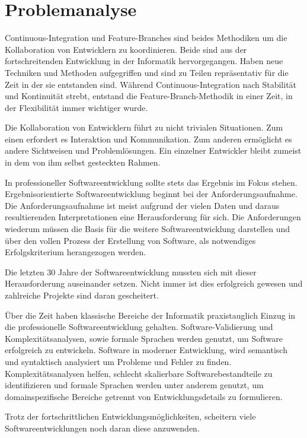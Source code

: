 \chapter{Problemanalyse}

Continuous-Integration und Feature-Branches sind beides Methodiken um die Kollaboration von Entwicklern zu koordinieren. Beide sind aus der fortschreitenden Entwicklung in der Informatik hervorgegangen. Haben neue Techniken und Methoden aufgegriffen und sind zu Teilen repräsentativ für die Zeit in der sie entstanden sind. Während Continuous-Integration nach Stabilität und Kontinuität strebt, entstand die Feature-Branch-Methodik in einer Zeit, in der Flexibilität immer wichtiger wurde.

Die Kollaboration von Entwicklern führt zu nicht trivialen Situationen. Zum einen erfordert es Interaktion und Kommunikation. Zum anderen ermöglicht es andere Sichtweisen und Problemlösungen. Ein einzelner Entwickler bleibt zumeist in dem von ihm selbst gesteckten Rahmen.

In professioneller Softwareentwicklung sollte stets das Ergebnis im Fokus stehen. Ergebnisorientierte Softwareentwicklung beginnt bei der Anforderungsaufnahme. Die Anforderungsaufnahme ist meist aufgrund der vielen Daten und daraus resultierenden Interpretationen eine Herausforderung für sich. Die Anforderungen wiederum müssen die Basis für die weitere Softwareentwicklung darstellen und über den vollen Prozess der Erstellung von Software, als notwendiges Erfolgskriterium herangezogen werden.

Die letzten 30 Jahre der Softwareentwicklung mussten sich mit dieser Herausforderung auseinander setzen. Nicht immer ist dies erfolgreich gewesen und zahlreiche Projekte sind daran gescheitert.

Über die Zeit haben klassische Bereiche der Informatik praxistauglich Einzug in die professionelle Softwareentwicklung gehalten. Software-Validierung und Komplexitätsanalysen, sowie formale Sprachen werden genutzt, um Software erfolgreich zu entwickeln. Software in moderner Entwicklung, wird semantisch und syntaktisch analysiert um Probleme und Fehler zu finden. Komplexitätsanalysen helfen, schlecht skalierbare Softwarebestandteile zu identifizieren und formale Sprachen werden unter anderem genutzt, um domainspezifische Bereiche getrennt von Entwicklungsdetails zu formulieren.

Trotz der fortschrittlichen Entwicklungsmöglichkeiten, scheitern viele Softwareentwicklungen noch daran diese anzuwenden.

